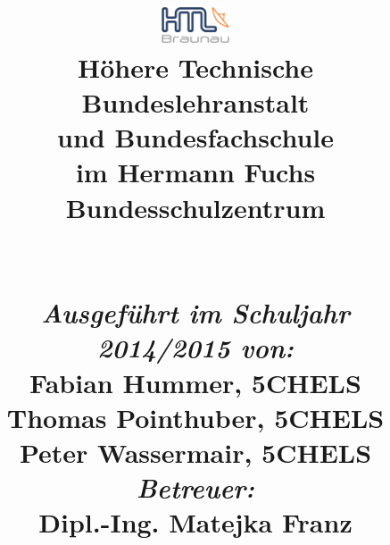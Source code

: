 
\begin{titlepage}
\title{
%
{\includegraphics[width=0.15\textwidth]{./includes/htl_c_cmyk_rein.pdf}}
%
\\{\normalsize \textbf{Höhere Technische Bundeslehranstalt}}
\\[-0.4em] {\normalsize \textbf{und Bundesfachschule}}
\\[-0.4em] {\normalsize im Hermann Fuchs Bundesschulzentrum}
%
\\\vspace{3cm}{ \textbf{\htlArbeitsthema}}
%
\\\vspace{0.5cm} {\Large \textsc{\htlArbeit}}
%
\\\vspace{5cm}
%
{\normalsize \emph{Ausgeführt im Schuljahr 2014/2015 von:}}
\\{\normalsize Fabian Hummer, 5CHELS}
\\[-0.4em] {\normalsize Thomas Pointhuber, 5CHELS}
\\[-0.4em] {\normalsize Peter Wassermair, 5CHELS}
\\[1.0em] {\normalsize \emph{Betreuer:}}
\\{\normalsize Dipl.-Ing. Matejka Franz}
}		
%
\maketitle
\end{titlepage}
\restoregeometry
\pagebreak
